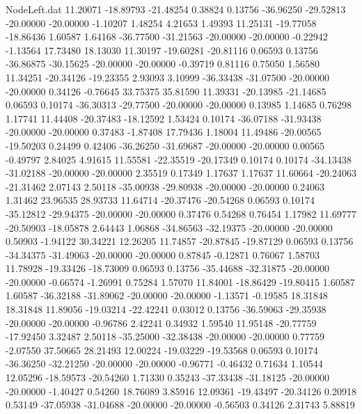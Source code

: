 \begin{filecontents}{NodeLeft.dat}
  11.20071  -18.89793  -21.48254     0.38824    0.13756  -36.96250  -29.52813  -20.00000  -20.00000   -1.10207    1.48254    4.21653    1.49393
  11.25131  -19.77058  -18.86436     1.60587    1.64168  -36.77500  -31.21563  -20.00000  -20.00000   -0.22942   -1.13564   17.73480   18.13030
  11.30197  -19.60281  -20.81116     0.06593    0.13756  -36.86875  -30.15625  -20.00000  -20.00000   -0.39719    0.81116    0.75050    1.56580
  11.34251  -20.34126  -19.23355     2.93093    3.10999  -36.33438  -31.07500  -20.00000  -20.00000    0.34126   -0.76645   33.75375   35.81590
  11.39331  -20.13985  -21.14685     0.06593    0.10174  -36.30313  -29.77500  -20.00000  -20.00000    0.13985    1.14685    0.76298    1.17741
  11.44408  -20.37483  -18.12592     1.53424    0.10174  -36.07188  -31.93438  -20.00000  -20.00000    0.37483   -1.87408   17.79436    1.18004
  11.49486  -20.00565  -19.50203     0.24499    0.42406  -36.26250  -31.69687  -20.00000  -20.00000    0.00565   -0.49797    2.84025    4.91615
  11.55581  -22.35519  -20.17349     0.10174    0.10174  -34.13438  -31.02188  -20.00000  -20.00000    2.35519    0.17349    1.17637    1.17637
  11.60664  -20.24063  -21.31462     2.07143    2.50118  -35.00938  -29.80938  -20.00000  -20.00000    0.24063    1.31462   23.96535   28.93733
  11.64714  -20.37476  -20.54268     0.06593    0.10174  -35.12812  -29.94375  -20.00000  -20.00000    0.37476    0.54268    0.76454    1.17982
  11.69777  -20.50903  -18.05878     2.64443    1.06868  -34.86563  -32.19375  -20.00000  -20.00000    0.50903   -1.94122   30.34221   12.26205
  11.74857  -20.87845  -19.87129     0.06593    0.13756  -34.34375  -31.49063  -20.00000  -20.00000    0.87845   -0.12871    0.76067    1.58703
  11.78928  -19.33426  -18.73009     0.06593    0.13756  -35.44688  -32.31875  -20.00000  -20.00000   -0.66574   -1.26991    0.75284    1.57070
  11.84001  -18.86429  -19.80415     1.60587    1.60587  -36.32188  -31.89062  -20.00000  -20.00000   -1.13571   -0.19585   18.31848   18.31848
  11.89056  -19.03214  -22.42241     0.03012    0.13756  -36.59063  -29.35938  -20.00000  -20.00000   -0.96786    2.42241    0.34932    1.59540
  11.95148  -20.77759  -17.92450     3.32487    2.50118  -35.25000  -32.38438  -20.00000  -20.00000    0.77759   -2.07550   37.50665   28.21493
  12.00224  -19.03229  -19.53568     0.06593    0.10174  -36.36250  -32.21250  -20.00000  -20.00000   -0.96771   -0.46432    0.71634    1.10544
  12.05296  -18.59573  -20.54260     1.71330    0.35243  -37.33438  -31.18125  -20.00000  -20.00000   -1.40427    0.54260   18.76089    3.85916
  12.09361  -19.43497  -20.34126     0.20918    0.53149  -37.05938  -31.04688  -20.00000  -20.00000   -0.56503    0.34126    2.31743    5.88819

\end{filecontents}
